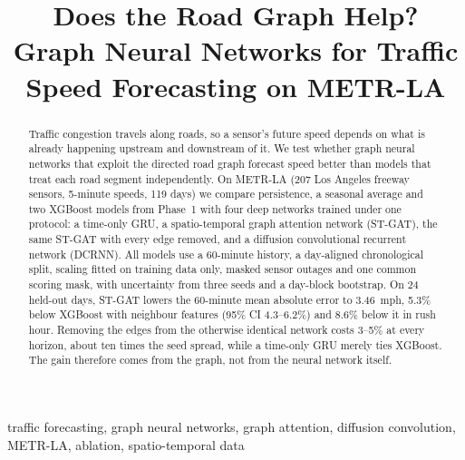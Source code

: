 \documentclass[conference]{IEEEtran}
\begin{document}
\title{Does the Road Graph Help?\\Graph Neural Networks for Traffic Speed Forecasting on METR-LA}

\author{
}

\maketitle

\begin{abstract}
Traffic congestion travels along roads, so a sensor's future speed depends on what is already happening upstream and downstream of it. We test whether graph neural networks that exploit the directed road graph forecast speed better than models that treat each road segment independently. On METR-LA (207 Los Angeles freeway sensors, 5-minute speeds, 119 days) we compare persistence, a seasonal average and two XGBoost models from Phase~1 with four deep networks trained under one protocol: a time-only GRU, a spatio-temporal graph attention network (ST-GAT), the same ST-GAT with every edge removed, and a diffusion convolutional recurrent network (DCRNN). All models use a 60-minute history, a day-aligned chronological split, scaling fitted on training data only, masked sensor outages and one common scoring mask, with uncertainty from three seeds and a day-block bootstrap. On 24 held-out days, ST-GAT lowers the 60-minute mean absolute error to 3.46~mph, 5.3\% below XGBoost with neighbour features (95\% CI 4.3--6.2\%) and 8.6\% below it in rush hour. Removing the edges from the otherwise identical network costs 3--5\% at every horizon, about ten times the seed spread, while a time-only GRU merely ties XGBoost. The gain therefore comes from the graph, not from the neural network itself.
\end{abstract}

\begin{IEEEkeywords}
traffic forecasting, graph neural networks, graph attention, diffusion convolution, METR-LA, ablation, spatio-temporal data
\end{IEEEkeywords}
\end{document}
